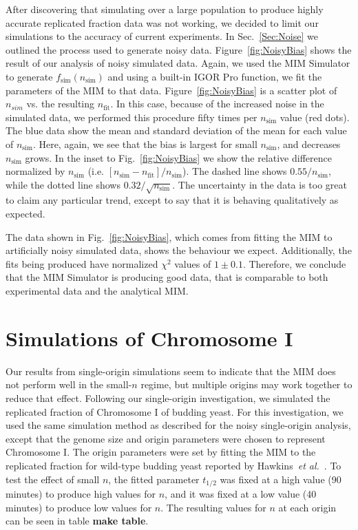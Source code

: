 		After discovering that simulating over a large population to produce highly accurate replicated fraction data was not working, we decided to limit our simulations to the accuracy of current experiments.
		In Sec.~\ref{Sec:Noise} we outlined the process used to generate noisy data.
		Figure~\ref{fig:NoisyBias} shows the result of our analysis of noisy simulated data.
		Again, we used the MIM Simulator to generate $f_\text{sim}(n_\text{sim})$ and using a built-in IGOR Pro function, we fit the parameters of the MIM to that data.
		Figure~\ref{fig:NoisyBias} is a scatter plot of $n_{sim}$ vs. the resulting $n_\text{fit}$.
		In this case, because of the increased noise in the simulated data, we performed this procedure fifty times per $n_\text{sim}$ value (red dots).
		The blue data show the mean and standard deviation of the mean for each value of $n_\text{sim}$.
		Here, again, we see that the bias is largest for small $n_\text{sim}$, and decreases $n_\text{sim}$ grows.
		In the inset to Fig.~\ref{fig:NoisyBias} we show the relative difference normalized by $n_\text{sim}$ (i.e. $[n_\text{sim} - n_\text{fit}]/n_\text{sim}$).
		The dashed line shows $0.55/n_\text{sim}$, while the dotted line shows $0.32/\sqrt{n_\text{sim}}$.
		The uncertainty in the data is too great to claim any particular trend, except to say that it is behaving qualitatively as expected.
		
		The data shown in Fig.~\ref{fig:NoisyBias}, which comes from fitting the MIM to artificially noisy simulated data, shows the behaviour we expect.
		Additionally, the fits being produced have normalized $\chi^2$ values of $1\pm 0.1$.
		Therefore, we conclude that the MIM Simulator is producing good data, that is comparable to both experimental data and the analytical MIM.
		
		
	\section{Simulations of Chromosome I}
	\label{sec:ChromosomeI}
	
	Our results from single-origin simulations seem to indicate that the MIM does not perform well in the small-$n$ regime, but multiple origins may work together to reduce that effect.
	Following our single-origin investigation, we simulated the replicated fraction of Chromosome I of budding yeast.
	For this investigation, we used the same simulation method as described for the noisy single-origin analysis, except that the genome size and origin parameters were chosen to represent Chromosome I.
	The origin parameters were set by fitting the MIM to the replicated fraction for wild-type budding yeast reported by Hawkins~\emph{et al.}~\cite{StochasticTermination}.
	To test the effect of small $n$, the fitted parameter $t_{1/2}$ was fixed at a high value (90 minutes) to produce high values for $n$, and it was fixed at a low value (40 minutes) to produce low values for $n$.
	The resulting values for $n$ at each origin can be seen in table \textbf{make table}.
	
